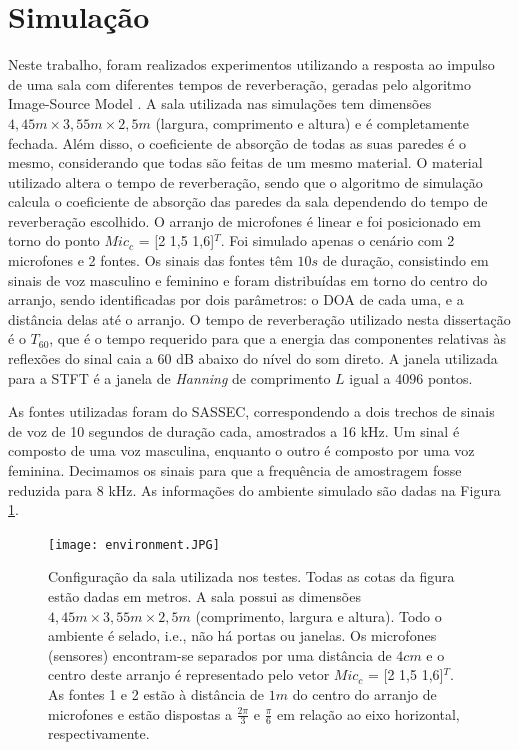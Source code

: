 \label{chap:4}
\section{Simulação}\label{sec:simulation}

Neste trabalho, foram realizados experimentos utilizando a resposta ao impulso de uma sala com diferentes tempos de reverberação, geradas pelo algoritmo Image-Source Model \cite{simulation}. A sala utilizada nas simulações tem dimensões $4,45m \times 3,55m \times 2,5m$ (largura, comprimento e altura) e é completamente fechada. Além disso, o coeficiente de absorção de todas as suas paredes é o mesmo, considerando que todas são feitas de um mesmo material. O material utilizado altera o tempo de reverberação, sendo que o algoritmo de simulação calcula o coeficiente de absorção das paredes da sala dependendo do tempo de reverberação escolhido. O arranjo de microfones é linear e foi posicionado em torno do ponto $Mic_c$ = [2 1,5 1,6]$^T$. Foi simulado apenas o cenário com 2 microfones e 2 fontes. Os sinais das fontes têm $10s$ de duração, consistindo em sinais de voz masculino e feminino e foram distribuídas em torno do centro do arranjo, sendo identificadas por dois parâmetros: o DOA de cada uma, e a distância delas até o arranjo. O tempo de reverberação utilizado nesta dissertação é o ${T_{60}}$, que é o tempo requerido para que a energia das componentes relativas às reflexões do sinal caia a 60 dB abaixo do nível do som direto. A janela utilizada para a STFT é a janela de \textit{Hanning} de comprimento $L$ igual a $4096$ pontos.

As fontes utilizadas foram do SASSEC, correspondendo a dois trechos de sinais de voz de 10 segundos de duração cada, amostrados a 16 kHz. Um sinal é composto de uma voz masculina, enquanto o outro é composto por uma voz feminina. Decimamos os sinais para que a frequência de amostragem fosse reduzida para 8 kHz. As informações do ambiente simulado são dadas na Figura \ref{fig:environment}.

\begin{figure}
    \centering
    \texttt{[image: environment.JPG]}
    \caption{Configuração da sala utilizada nos testes. Todas as cotas da figura estão dadas em metros. A sala possui as dimensões $4,45m \times 3,55m \times 2,5m$ (comprimento, largura e altura). Todo o ambiente é selado, i.e., não há portas ou janelas. Os microfones (sensores) encontram-se separados por uma distância de $4cm$ e o centro deste arranjo é representado pelo vetor $Mic_c$ = [2 1,5 1,6]$^T$. As fontes 1 e 2 estão à distância de $1m$ do centro do arranjo de microfones e estão dispostas a $\frac{2\pi}{3}$ e $\frac{\pi}{6}$ em relação ao eixo horizontal, respectivamente.}
    \label{fig:environment}
\end{figure}


